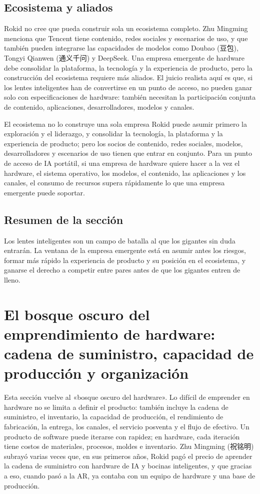 \documentclass[a4paper]{article}
\begin{document}
\subsection{Ecosistema y aliados}

Rokid no cree que pueda construir sola un ecosistema completo. Zhu Mingming menciona que Tencent tiene contenido, redes sociales y escenarios de uso, y que también pueden integrarse las capacidades de modelos como Doubao (豆包), Tongyi Qianwen (通义千问) y DeepSeek. Una empresa emergente de hardware debe consolidar la plataforma, la tecnología y la experiencia de producto, pero la construcción del ecosistema requiere más aliados. El juicio realista aquí es que, si los lentes inteligentes han de convertirse en un punto de acceso, no pueden ganar solo con especificaciones de hardware: también necesitan la participación conjunta de contenido, aplicaciones, desarrolladores, modelos y canales.

\begin{importantbox}{El ecosistema no lo construye una sola empresa}
Rokid puede asumir primero la exploración y el liderazgo, y consolidar la tecnología, la plataforma y la experiencia de producto; pero los socios de contenido, redes sociales, modelos, desarrolladores y escenarios de uso tienen que entrar en conjunto. Para un punto de acceso de IA portátil, si una empresa de hardware quiere hacer a la vez el hardware, el sistema operativo, los modelos, el contenido, las aplicaciones y los canales, el consumo de recursos supera rápidamente lo que una empresa emergente puede soportar.
\end{importantbox}

\subsection{Resumen de la sección}

Los lentes inteligentes son un campo de batalla al que los gigantes sin duda entrarán. La ventana de la empresa emergente está en asumir antes los riesgos, formar más rápido la experiencia de producto y su posición en el ecosistema, y ganarse el derecho a competir entre pares antes de que los gigantes entren de lleno.
\section{El bosque oscuro del emprendimiento de hardware: cadena de suministro, capacidad de producción y organización}

Esta sección vuelve al «bosque oscuro del hardware». Lo difícil de emprender en hardware no se limita a definir el producto: también incluye la cadena de suministro, el inventario, la capacidad de producción, el rendimiento de fabricación, la entrega, los canales, el servicio posventa y el flujo de efectivo. Un producto de software puede iterarse con rapidez; en hardware, cada iteración tiene costos de materiales, procesos, moldes e inventario. Zhu Mingming (祝铭明) subrayó varias veces que, en sus primeros años, Rokid pagó el precio de aprender la cadena de suministro con hardware de IA y bocinas inteligentes, y que gracias a eso, cuando pasó a la AR, ya contaba con un equipo de hardware y una base de producción.
\end{document}
